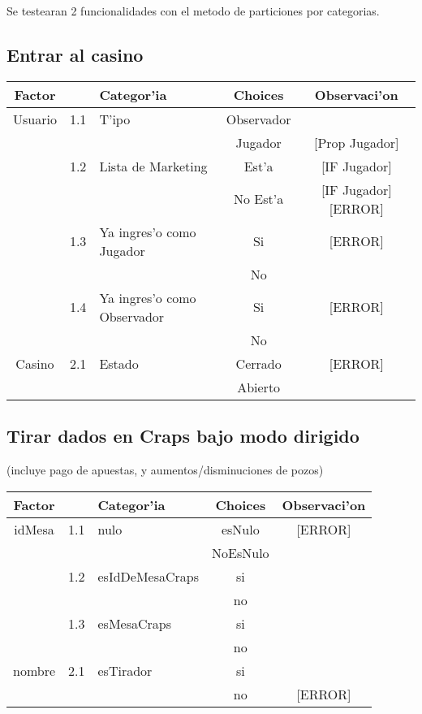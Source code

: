 Se testearan 2 funcionalidades con el metodo de particiones por categorias.


\subsection{Entrar al casino} 


\begin{tabular}{|c|ll|c|c|}
 \hline
\textbf{Factor} &  &\textbf{Categor'ia}  &  \textbf{Choices}  & \textbf{Observaci'on}\\
\hline
Usuario &  1.1 & T'ipo &  Observador & \\ 
\hline
&  &  &Jugador & [Prop Jugador]\\
\hline
& 1.2 &Lista de Marketing  & Est'a  &[IF Jugador] \\
\hline
& & & No Est'a  & [IF Jugador] [ERROR]\\
\hline
& 1.3 &Ya ingres'o como Jugador & Si  & [ERROR]\\
\hline
& & & No  & \\
\hline
& 1.4 &Ya ingres'o como Observador & Si  &[ERROR] \\
\hline
& & & No  & \\
\hline
Casino & 2.1 &Estado &  Cerrado & [ERROR]\\ 
\hline
& & & Abierto & \\
\hline
\end{tabular}


\subsection{Tirar dados en Craps bajo modo dirigido}
(incluye pago de apuestas, y aumentos/disminuciones de pozos)


\begin{tabular}{|c|ll|c|c|}
 \hline
\textbf{Factor} &  &\textbf{Categor'ia}  &  \textbf{Choices}  & \textbf{Observaci'on}\\
\hline
 idMesa & 1.1 & nulo & esNulo &  [ERROR]\\
\hline
  &  &  & NoEsNulo &  \\
\hline
  &1.2  & esIdDeMesaCraps  & si &     \\
\hline
  & &  & no & \\
 \hline
        &1.3 & esMesaCraps& si  &  \\
\hline
        & &            & no &  \\

\hline
nombre  &2.1 & esTirador   & si &  \\
\hline
        & &             & no & [ERROR] \\
\hline





\end{tabular}

